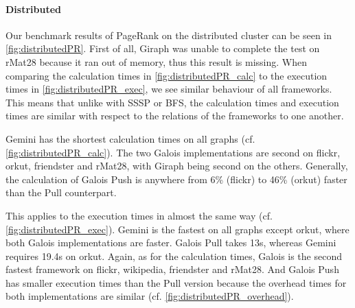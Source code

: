 \paragraph{Distributed}
Our benchmark results of PageRank on the distributed cluster can be seen in \autoref{fig:distributedPR}.
First of all, Giraph was unable to complete the test on rMat28 because it ran out of memory, thus this result is missing.
When comparing the calculation times in \autoref{fig:distributedPR_calc} to the execution times in \autoref{fig:distributedPR_exec}, we see similar behaviour of all frameworks.
This means that unlike with SSSP or BFS, the calculation times and execution times are similar with respect to the relations of the frameworks to one another.

Gemini has the shortest calculation times on all graphs (cf. \autoref{fig:distributedPR_calc}).
The two Galois implementations are second on flickr, orkut, friendster and rMat28, with Giraph being second on the others.
Generally, the calculation of Galois Push is anywhere from 6\% (flickr) to 46\% (orkut) faster than the Pull counterpart.

This applies to the execution times in almost the same way (cf. \autoref{fig:distributedPR_exec}).
Gemini is the fastest on all graphs except orkut, where both Galois implementations are faster. Galois Pull takes 13s, whereas Gemini requires 19.4s on orkut.
Again, as for the calculation times, Galois is the second fastest framework on flickr, wikipedia, friendster and rMat28.
And Galois Push has smaller execution times than the Pull version because the overhead times for both implementations are similar (cf. \autoref{fig:distributedPR_overhead}).

